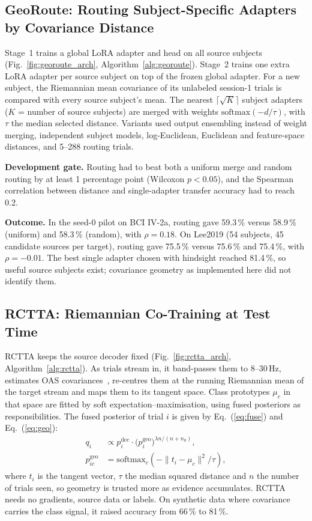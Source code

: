 \documentclass[preprint,12pt]{elsarticle}
\newcommand{\rev}[1]{#1}
\begin{document}
\subsection{GeoRoute: Routing Subject-Specific Adapters by Covariance Distance}
Stage~1 trains a global LoRA adapter and head on all source subjects (Fig.~\ref{fig:georoute_arch}, Algorithm~\ref{alg:georoute}). Stage~2 trains one extra LoRA adapter per source subject on top of the frozen global adapter. For a new subject, the Riemannian mean covariance of its unlabeled session-1 trials is compared with every source subject's mean. The nearest $\lceil\sqrt{K}\rceil$ subject adapters ($K$ = number of source subjects) are merged with weights $\mathrm{softmax}(-d/\tau)$, with $\tau$ the median selected distance. Variants used output ensembling instead of weight merging, independent subject models, log-Euclidean, Euclidean and feature-space distances, and 5--288 routing trials.

\textbf{\rev{Development gate.}} Routing had to beat both a uniform merge and random routing by at least 1 percentage point (Wilcoxon $p<0.05$), and the Spearman correlation between distance and single-adapter transfer accuracy had to reach 0.2.

\textbf{Outcome.} In the seed-0 pilot on BCI IV-2a, routing gave 59.3\,\% versus 58.9\,\% (uniform) and 58.3\,\% (random), with $\rho=0.18$. On Lee2019 (54 subjects, 45 candidate sources per target), routing gave 75.5\,\% versus 75.6\,\% and 75.4\,\%, with $\rho=-0.01$. The best single adapter chosen with hindsight reached 81.4\,\%, so useful source subjects exist; covariance geometry \rev{as implemented here} did not identify them.

\subsection{RCTTA: Riemannian Co-Training at Test Time}\label{sec:rctta}
RCTTA keeps the source decoder fixed (Fig.~\ref{fig:rctta_arch}, Algorithm~\ref{alg:rctta}). As trials stream in, it band-passes them to 8--30\,Hz, estimates OAS covariances~\cite{chen2010oas}, re-centres them at the running Riemannian mean of the target stream and maps them to its tangent space. Class prototypes $\mu_c$ in that space are fitted by soft expectation--maximisation, using fused posteriors as responsibilities. The fused posterior of trial $i$ is \rev{given by Eq.~(\ref{eq:fuse}) and Eq.~(\ref{eq:geo})}:
\begin{align}
q_i &\propto p^{\mathrm{dec}}_i \cdot \big(p^{\mathrm{geo}}_i\big)^{\lambda n/(n+n_0)}, \label{eq:fuse}\\
p^{\mathrm{geo}}_{ic} &= \mathrm{softmax}_c\!\left(-\lVert t_i-\mu_c\rVert^2/\tau\right), \label{eq:geo}
\end{align}
where $t_i$ is the tangent vector, $\tau$ the median squared distance and $n$ the number of trials seen, so geometry is trusted more as evidence accumulates. RCTTA needs no gradients, source data or labels. On synthetic data where covariance carries the class signal, it raised accuracy from 66\,\% to 81\,\%.
\end{document}
